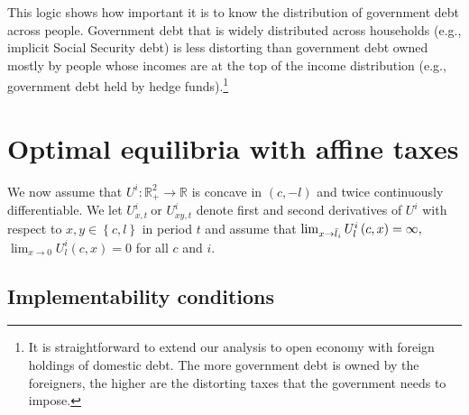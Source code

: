 \documentclass[thmsb,11pt]{article}
\begin{document}
This logic shows how important it is to know the distribution of government debt across people. Government debt that is widely distributed across households
(e.g., implicit Social Security debt) is less distorting than
 government debt owned mostly by people whose incomes are at the top of the income
distribution (e.g., government debt held by hedge funds).\footnote{%
It is straightforward to extend our analysis to open economy with foreign
holdings of domestic debt. The more government debt is owned by the
foreigners, the higher are the distorting taxes that  the government  needs to
impose.}



\section{Optimal equilibria with affine taxes}\label{Sec: characterization}



 We now assume that $U^{i}:\mathbb{R}%
_{+}^{2}\rightarrow \mathbb{R}$ is concave in $\left( c,-l\right) $ and
twice continuously differentiable. We let $U_{x,t}^{i}\ $or $U_{xy,t}^{i}$
denote first and second derivatives of $U^{i}$ with respect to $x,y\in
\left\{ c,l\right\} $ in period $t$ and assume that $\lim_{x\rightarrow \bar{%
l}_{i}}U_{l}^{i}\left( c,x\right) =\infty ,$ $\lim_{x\rightarrow
0}U_{l}^{i}\left( c,x\right) =0$ for all $c$ and $i.$

\subsection{Implementability conditions\label{Sec: impl and Bellman}}
\end{document}
